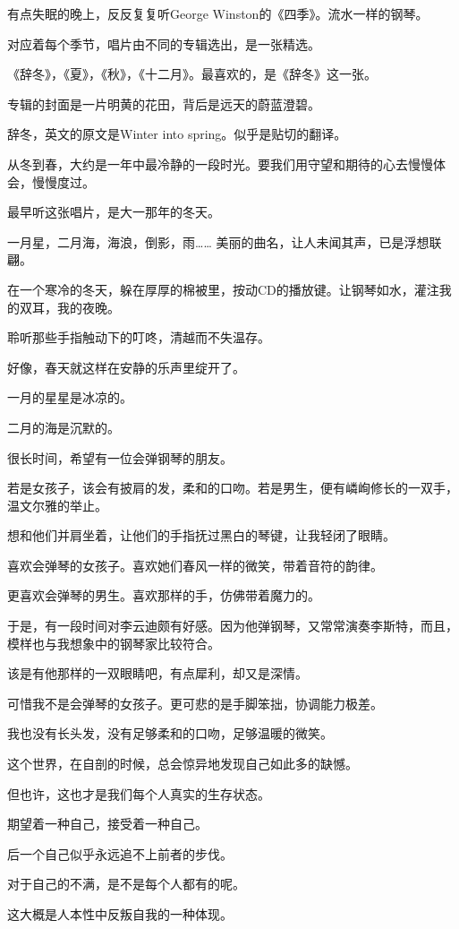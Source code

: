 \documentclass[12pt,a4paper]{article}
\def\blankrev{\vspace{1ex}}									%
\begin{document}
		有点失眠的晚上，反反复复听George Winston的《四季》。流水一样的钢琴。\par
		对应着每个季节，唱片由不同的专辑选出，是一张精选。\par
		《辞冬》，《夏》，《秋》，《十二月》。最喜欢的，是《辞冬》这一张。\par
		专辑的封面是一片明黄的花田，背后是远天的蔚蓝澄碧。\par
		辞冬，英文的原文是Winter into spring。似乎是贴切的翻译。\par
		从冬到春，大约是一年中最冷静的一段时光。要我们用守望和期待的心去慢慢体会，慢慢度过。\par
		最早听这张唱片，是大一那年的冬天。\par
		一月星，二月海，海浪，倒影，雨…… 美丽的曲名，让人未闻其声，已是浮想联翩。\par
		在一个寒冷的冬天，躲在厚厚的棉被里，按动CD的播放键。让钢琴如水，灌注我的双耳，我的夜晚。\par
		聆听那些手指触动下的叮咚，清越而不失温存。\par
		好像，春天就这样在安静的乐声里绽开了。\par
		一月的星星是冰凉的。\par
		二月的海是沉默的。

		\blankrev
		很长时间，希望有一位会弹钢琴的朋友。\par
		若是女孩子，该会有披肩的发，柔和的口吻。若是男生，便有嶙峋修长的一双手，温文尔雅的举止。\par
		想和他们并肩坐着，让他们的手指抚过黑白的琴键，让我轻闭了眼睛。\par
		喜欢会弹琴的女孩子。喜欢她们春风一样的微笑，带着音符的韵律。\par
		更喜欢会弹琴的男生。喜欢那样的手，仿佛带着魔力的。\par
		于是，有一段时间对李云迪颇有好感。因为他弹钢琴，又常常演奏李斯特，而且，模样也与我想象中的钢琴家比较符合。\par
		该是有他那样的一双眼睛吧，有点犀利，却又是深情。

		\blankrev
		可惜我不是会弹琴的女孩子。更可悲的是手脚笨拙，协调能力极差。\par
		我也没有长头发，没有足够柔和的口吻，足够温暖的微笑。\par
		这个世界，在自剖的时候，总会惊异地发现自己如此多的缺憾。\par
		但也许，这也才是我们每个人真实的生存状态。\par
		期望着一种自己，接受着一种自己。\par
		后一个自己似乎永远追不上前者的步伐。\par
		对于自己的不满，是不是每个人都有的呢。\par
		这大概是人本性中反叛自我的一种体现。
\end{document}
